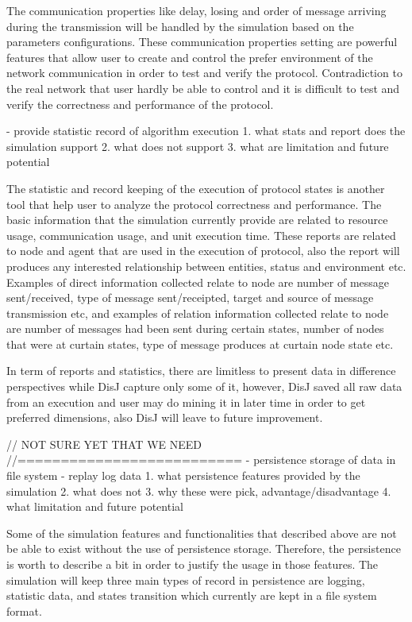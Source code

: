  The communication  properties like delay, losing and order of message arriving during the transmission will be handled by the simulation based on the parameters configurations. These communication properties setting are powerful features that allow user to create and control the prefer environment of the network communication in order to test and verify the protocol. Contradiction to the real network that user hardly be able to control and it is difficult to test and verify the correctness and performance of the protocol.


- provide statistic record of algorithm execution
1. what stats and report does the simulation support
2. what does not support
3. what are limitation and future potential

The statistic and record keeping of the execution of protocol states is another tool that help user to analyze the protocol correctness and performance. The basic information that the simulation currently provide are related to resource usage, communication usage, and unit execution time. These reports are related to node and agent that are used in the execution of protocol, also the report will produces any interested relationship between entities, status and environment etc. Examples of direct information collected relate to node are number of message sent/received, type of message sent/receipted, target and source of message transmission etc, and examples of relation information collected relate to node are number of messages had been sent during certain states, number of nodes that were at curtain states, type of message produces at curtain node state etc.

In term of reports and statistics, there are limitless to present data in difference perspectives while DisJ capture only some of it, however, DisJ saved all raw data from an execution and user may do mining it in later time in order to get preferred dimensions, also DisJ will leave to future improvement.

// NOT SURE YET THAT WE NEED
//==========================
- persistence storage of data in file system
	- replay log data
1. what persistence features provided by the simulation
2. what does not
3. why these were pick, advantage/disadvantage
4. what limitation and future potential

Some of the simulation features and functionalities that described above are not be able to exist without the use of persistence storage. Therefore, the persistence is worth to describe a bit in order to justify the usage in those features. The simulation will keep three main types of record in persistence are logging, statistic data, and states transition which currently are kept in a file system format.

